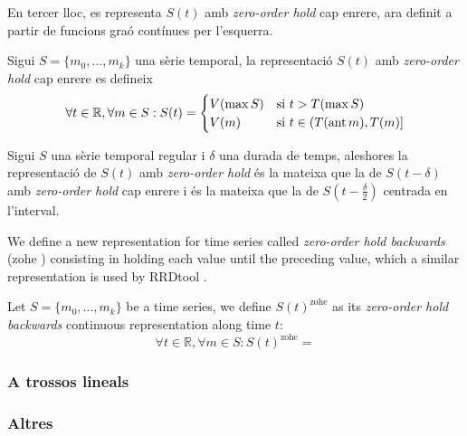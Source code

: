 En tercer lloc, es representa $S(t)$ amb \emph{zero-order hold} cap enrere, ara definit a partir de funcions graó contínues per l'esquerra.
\begin{definition}
  Sigui $S=\{m_0,\ldots,m_k\}$ una sèrie temporal, la representació
  $S(t)$ amb \emph{zero-order hold} cap enrere es defineix
\[
\forall t \in \mathbb{R}  ,\forall m \in S:
S(t) =  
\begin{cases}
  V(\max S) & \text{si } t > T(\max S) \\
  V(m) & \text{si }  t\in (T(\operatorname*{ant} m),T(m)]
\end{cases}
\]
\end{definition}

Sigui $S$ una sèrie temporal regular i $\delta$ una durada de temps, aleshores la representació de $S(t)$ amb \emph{zero-order hold} és la mateixa que la de $S(t-\delta)$ amb \emph{zero-order hold} cap enrere i és la mateixa que la de $S(t-\frac{\delta}{2})$ centrada en l'interval. 





We define a new representation for time series called
\emph{zero-order hold backwards}
(zohe%
) consisting in holding each value until the preceding value, which a
similar representation is used by RRDtool \cite{lisa98:oetiker}.






Let $S=\{m_0,\ldots,m_k\}$ be a time series, we define
$S(t)^{\text{zohe}}$ as its \emph{zero-order hold backwards}
continuous representation along time $t$:
\[
\forall t \in \mathbb{R}  ,\forall m \in S:
S(t)^{\text{zohe}} =  
\]





\subsubsection{A trossos lineals}

\todo{}



\subsubsection{Altres}

